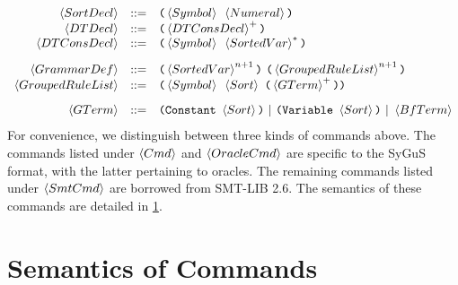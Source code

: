\documentclass[english,a4paper,10pt]{article}
\begin{document}
\[\begin{array}{rcl}
 \sortdecl& ::= & \paren{\symbol\mbox{ }\intconst}\\
 \dtdecl & ::= & \paren{\kplus{\dtconsdecl}} \\
 \dtconsdecl & ::= & \paren{\symbol\mbox{ }\kstar{\sortedvar}} \\[2ex]
 \grammardef & ::= & \paren{\kstarn{\sortedvar}{n+1}}\mbox{ }\paren{\kstarn{\ntdef}{n+1}} \\
 \ntdef & ::= & \paren{\symbol\mbox{ }\sortexpr\mbox{ }\paren{ \kplus{\gterm} } } \\[2ex]
 \gterm 
 & ::= &  \paren{\constantkwd\mbox{ }\sortexpr}\mbox{ }|\mbox{ }\paren{\varkwd\mbox{ }\sortexpr}\mbox{ }|\mbox{ }\bfterm\\
\end{array}
\]
For convenience,
we distinguish between three kinds of commands above.
The commands listed under $\cmd$ and $\oraclecmd$ are specific to the SyGuS format,
with the latter pertaining to oracles.
The remaining commands listed under $\smtcmd$
are borrowed from SMT-LIB 2.6.
The semantics of these commands are detailed in \cref{sec:semantics}.


\section{Semantics of Commands}%
\label{sec:semantics}
\end{document}
